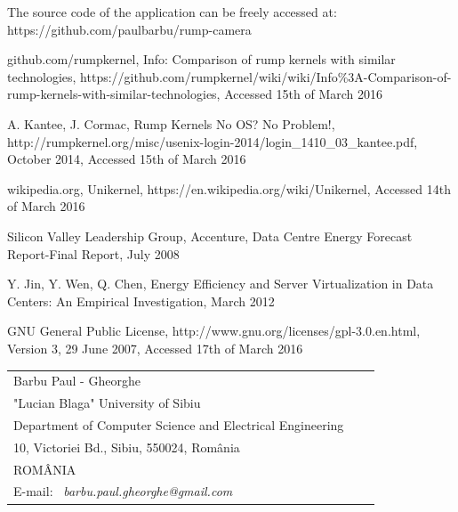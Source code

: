 \documentclass[10pt,a4paper,twoside]{article}
\begin{document}
 The source code of the application can be freely accessed at: https://github.com/paulbarbu/rump-camera

\begin{thebibliography}{*}\label{Refences}
github.com/rumpkernel, \newblock Info: Comparison of rump kernels with similar technologies,
\newblock https://github.com/rumpkernel/wiki/wiki/Info\%3A-Comparison-of-rump-kernels-with-similar-technologies,
\newblock Accessed 15th of March 2016

\vspace{-7pt}
A. Kantee, J. Cormac, \newblock Rump Kernels No OS? No Problem!,
\newblock http://rumpkernel.org/misc/usenix-login-2014/login\_1410\_03\_kantee.pdf,
\newblock October 2014,
\newblock Accessed 15th of March 2016

\vspace{-7pt}
wikipedia.org, \newblock Unikernel,
\newblock https://en.wikipedia.org/wiki/Unikernel,
\newblock Accessed 14th of March 2016

\vspace{-7pt}
Silicon Valley Leadership Group, Accenture, \newblock
Data Centre Energy Forecast Report-Final Report, \newblock July 2008

\vspace{-7pt}
Y. Jin, Y. Wen, Q. Chen,
\newblock Energy Efficiency and Server Virtualization in Data Centers: An Empirical Investigation,
\newblock March 2012

GNU General Public License, \newblock http://www.gnu.org/licenses/gpl-3.0.en.html,
\newblock Version 3, 29 June 2007,
\newblock Accessed 17th of March 2016

\end{thebibliography}

\vspace*{1cm} {\footnotesize
\begin{tabular*}{16cm}{p{4.2cm}p{4.2cm}p{4.2cm}}
Barbu Paul - Gheorghe & \\
"Lucian Blaga" University of Sibiu & \\
Department of Computer Science and Electrical Engineering & \\
10, Victoriei Bd., Sibiu, 550024, Rom\^ania & \\
ROM\^ANIA & \\
E-mail: \ {\it barbu.paul.gheorghe@gmail.com}&
\end{tabular*}}
\end{document}
